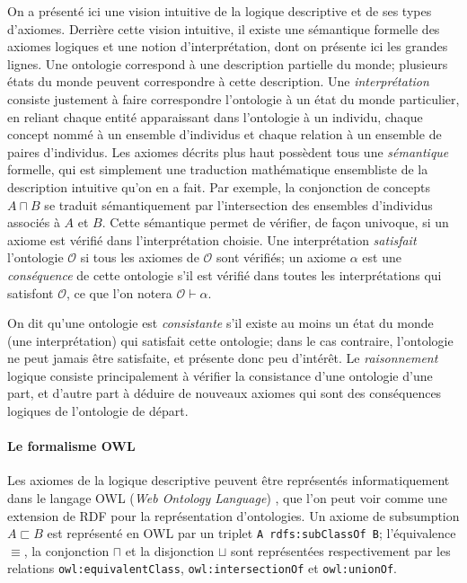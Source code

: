 On a présenté ici une vision intuitive de la logique descriptive et de ses types d'axiomes. Derrière cette vision intuitive, il existe une sémantique formelle des axiomes logiques et une notion d'interprétation, dont on présente ici les grandes lignes.
Une ontologie correspond à une description partielle du monde; plusieurs états du monde peuvent correspondre à cette description. Une \textit{interprétation} consiste justement à faire correspondre l'ontologie à un état du monde particulier, en reliant chaque entité apparaissant dans l'ontologie à un individu, chaque concept nommé à un ensemble d'individus et chaque relation à un ensemble de paires d'individus. Les axiomes décrits plus haut possèdent tous une \textit{sémantique} formelle, qui est simplement une traduction mathématique ensembliste de la description intuitive qu'on en a fait. Par exemple, la conjonction de concepts $A \sqcap B$ se traduit sémantiquement par l'intersection des ensembles d'individus associés à $A$ et $B$. Cette sémantique permet de vérifier, de façon univoque, si un axiome est vérifié dans l'interprétation choisie. Une interprétation \textit{satisfait} l'ontologie $\mathcal{O}$ si tous les axiomes de $\mathcal{O}$ sont vérifiés; un axiome $\alpha$ est une \textit{conséquence} de cette ontologie s'il est vérifié dans toutes les interprétations qui satisfont $\mathcal{O}$, ce que l'on notera $\mathcal{O} \vdash \alpha$.

On dit qu'une ontologie est \textit{consistante} s'il existe au moins un état du monde (une interprétation) qui satisfait cette ontologie; dans le cas contraire, l'ontologie ne peut jamais être satisfaite, et présente donc peu d'intérêt. Le \textit{raisonnement} logique consiste principalement à vérifier la consistance d'une ontologie d'une part, et d'autre part à déduire de nouveaux axiomes qui sont des conséquences logiques de l'ontologie de départ.


\paragraph{Le formalisme OWL}

Les axiomes de la logique descriptive peuvent être représentés informatiquement dans le langage OWL (\textit{Web Ontology Language}) \cite{Hitzler:12:OWO}, que l'on peut voir comme une extension de RDF pour la représentation d'ontologies. Un axiome de subsumption $A \sqsubset B$ est représenté en OWL par un triplet \texttt{A rdfs:subClassOf B}; l'équivalence $\equiv$, la conjonction $\sqcap$ et la disjonction $\sqcup$ sont représentées respectivement par les relations \texttt{owl:equivalentClass}, \texttt{owl:intersectionOf} et \texttt{owl:unionOf}. %

